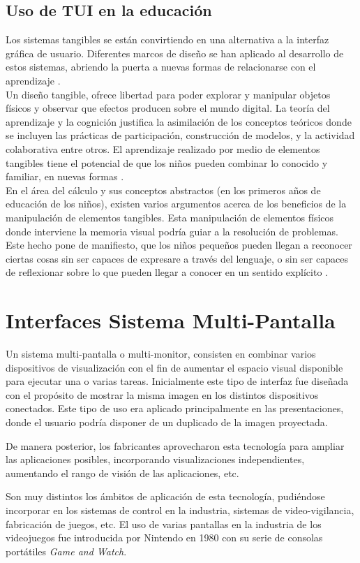 \subsection{Uso de TUI en la educación}

Los sistemas tangibles se están convirtiendo en una alternativa a la interfaz gráfica de usuario. Diferentes marcos de diseño se han aplicado al desarrollo de estos sistemas, abriendo la puerta a nuevas formas de relacionarse con el aprendizaje \cite{Marshall}.\\

Un diseño tangible, ofrece libertad para poder explorar y manipular objetos físicos y observar que efectos producen sobre el mundo digital. La teoría del aprendizaje y la cognición justifica la asimilación de los conceptos teóricos donde se incluyen las prácticas de participación, construcción de modelos, y la actividad colaborativa entre otros. El aprendizaje realizado por medio de elementos tangibles tiene el potencial de que los niños pueden combinar lo conocido y familiar, en nuevas formas \cite{Manches}.\\

En el área del cálculo y sus conceptos abstractos (en los primeros años de educación de los niños), existen varios argumentos acerca de los beneficios de la manipulación de elementos tangibles. Esta manipulación de elementos físicos donde interviene la memoria visual podría guiar a la resolución de problemas. Este hecho pone de manifiesto, que los niños pequeños pueden llegan a reconocer ciertas cosas sin ser capaces de expresare a través del lenguaje, o sin ser capaces de reflexionar sobre lo que pueden llegar a conocer en un sentido explícito \cite{Malley}.


\section{Interfaces Sistema Multi-Pantalla}
Un sistema multi-pantalla o multi-monitor, consisten en combinar varios dispositivos de visualización con el fin de aumentar el espacio visual disponible para ejecutar una o varias tareas.
Inicialmente este tipo de interfaz fue diseñada con el propósito de mostrar la misma imagen en los distintos dispositivos conectados. Este tipo de uso era aplicado principalmente en las presentaciones, donde el usuario podría disponer de un duplicado de la imagen proyectada.

De manera posterior, los fabricantes aprovecharon esta tecnología para ampliar las aplicaciones posibles, incorporando visualizaciones independientes, aumentando el rango de visión de las aplicaciones, etc.

Son muy distintos los ámbitos de aplicación de esta tecnología, pudiéndose incorporar en los sistemas de control en la industria, sistemas de video-vigilancia, fabricación de juegos, etc.
El uso de varias pantallas en la industria de los videojuegos fue introducida por Nintendo en 1980 con su serie de consolas portátiles \emph{Game and Watch}.

